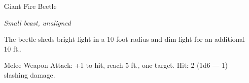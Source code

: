 \begin{monsterbox}{Giant Fire Beetle}
\begin{hangingpar}
\textit{Small beast, unaligned}
\end{hangingpar}
\dndline%
\basics[%
armorclass = 13,
hitpoints = 1d6 + 1,
speed = {30 ft.}
]
\dndline%
\stats[%
STR = \stat{8},
DEX = \stat{10},
CON = \stat{12},
INT = \stat{1},
WIS = \stat{7},
CHA = \stat{3}
]
\dndline%
\details[%
skills={},
damageimmunities={},
savingthrows={},
conditionimmunities={},
damageresistances={},
damagevulnerabilities={},
senses={blindsight 30 ft., passive Perception 8},
challenge=0
]
\dndline%
\begin{monsteraction}[Illumination]
The beetle sheds bright light in a 10-foot radius and dim light for an additional 10 ft..
\end{monsteraction}
\begin{monsteraction}[Bite]
Melee Weapon Attack: +1 to hit, reach 5 ft., one target. Hit: 2 (1d6 — 1) slashing damage.
\end{monsteraction}
\end{monsterbox}